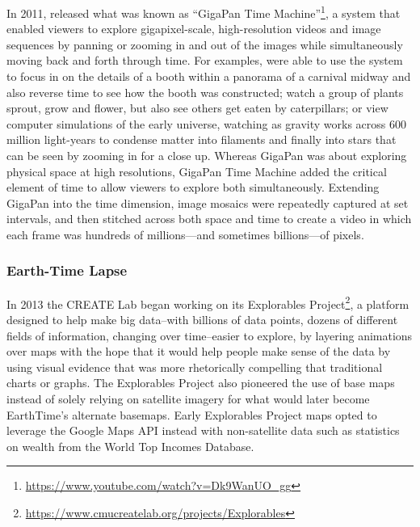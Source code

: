 \documentclass[
  12pt,
]{krantz}
\renewcommand{\href}[2]{#2\footnote{\url{#1}}}
\begin{document}
In 2011, released what was known as \href{https://www.youtube.com/watch?v=Dk9WanUO_gg}{``GigaPan Time Machine''}, a system that enabled viewers to explore gigapixel-scale, high-resolution videos and image sequences by panning or zooming in and out of the images while simultaneously moving back and forth through time. For examples, were able to use the system to focus in on the details of a booth within a panorama of a carnival midway and also reverse time to see how the booth was constructed; watch a group of plants sprout, grow and flower, but also see others get eaten by caterpillars; or view computer simulations of the early universe, watching as gravity works across 600 million light-years to condense matter into filaments and finally into stars that can be seen by zooming in for a close up. Whereas GigaPan was about exploring physical space at high resolutions, GigaPan Time Machine added the critical element of time to allow viewers to explore both simultaneously. Extending GigaPan into the time dimension, image mosaics were repeatedly captured at set intervals, and then stitched across both space and time to create a video in which each frame was hundreds of millions---and sometimes billions---of pixels.

\hypertarget{earth-time-lapse}{%
\subsubsection*{Earth-Time Lapse}\label{earth-time-lapse}}


In 2013 the CREATE Lab began working on its \href{https://www.cmucreatelab.org/projects/Explorables}{Explorables Project}, a platform designed to help make big data--with billions of data points, dozens of different fields of information, changing over time--easier to explore, by layering animations over maps with the hope that it would help people make sense of the data by using visual evidence that was more rhetorically compelling that traditional charts or graphs. The Explorables Project also pioneered the use of base maps instead of solely relying on satellite imagery for what would later become EarthTime's alternate basemaps. Early Explorables Project maps opted to leverage the Google Maps API instead with non-satellite data such as statistics on wealth from the World Top Incomes Database.
\end{document}
